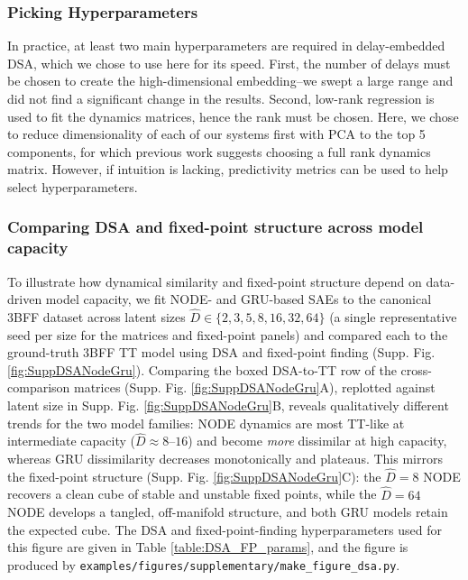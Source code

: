 \documentclass{article}
\begin{document}
\subsubsection{Picking Hyperparameters}

In practice, at least two main hyperparameters are required in delay-embedded DSA, which we chose to use here for its speed. First, the number of delays must be chosen to create the high-dimensional embedding--we swept a large range and did not find a significant change in the results. Second, low-rank regression is used to fit the dynamics matrices, hence the rank must be chosen. Here, we chose to reduce dimensionality of each of our systems first with PCA to the top 5 components, for which previous work suggests choosing a full rank dynamics matrix. However, if intuition is lacking, predictivity metrics can be used to help select hyperparameters.

\subsubsection{Comparing DSA and fixed-point structure across model capacity \label{appendix:DSA-NODE-GRU}}

To illustrate how dynamical similarity and fixed-point structure depend on data-driven model capacity, we fit NODE- and GRU-based SAEs to the canonical 3BFF dataset across latent sizes $\hat{D} \in \{2,3,5,8,16,32,64\}$ (a single representative seed per size for the matrices and fixed-point panels) and compared each to the ground-truth 3BFF TT model using DSA and fixed-point finding (Supp. Fig. \ref{fig:SuppDSANodeGru}). Comparing the boxed DSA-to-TT row of the cross-comparison matrices (Supp. Fig. \ref{fig:SuppDSANodeGru}A), replotted against latent size in Supp. Fig. \ref{fig:SuppDSANodeGru}B, reveals qualitatively different trends for the two model families: NODE dynamics are most TT-like at intermediate capacity ($\hat{D}\approx 8$--$16$) and become \emph{more} dissimilar at high capacity, whereas GRU dissimilarity decreases monotonically and plateaus. This mirrors the fixed-point structure (Supp. Fig. \ref{fig:SuppDSANodeGru}C): the $\hat{D}=8$ NODE recovers a clean cube of stable and unstable fixed points, while the $\hat{D}=64$ NODE develops a tangled, off-manifold structure, and both GRU models retain the expected cube. The DSA and fixed-point-finding hyperparameters used for this figure are given in Table \ref{table:DSA_FP_params}, and the figure is produced by \texttt{examples/figures/supplementary/make\_figure\_dsa.py}.
\end{document}
